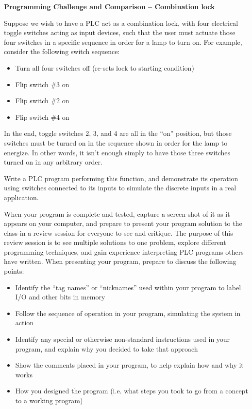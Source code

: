 

\noindent
{\bf Programming Challenge and Comparison -- Combination lock}

\vskip 10pt

Suppose we wish to have a PLC act as a combination lock, with four electrical toggle switches acting as input devices, such that the user must actuate those four switches in a specific sequence in order for a lamp to turn on.  For example, consider the following switch sequence:

\begin{itemize}
\item{} Turn all four switches off (re-sets lock to starting condition)
\item{} Flip switch \#3 on
\item{} Flip switch \#2 on
\item{} Flip switch \#4 on
\end{itemize}

In the end, toggle switches 2, 3, and 4 are all in the ``on'' position, but those switches must be turned on in the sequence shown in order for the lamp to energize.  In other words, it isn't enough simply to have those three switches turned on in any arbitrary order.

Write a PLC program performing this function, and demonstrate its operation using switches connected to its inputs to simulate the discrete inputs in a real application.  

\vskip 10pt

When your program is complete and tested, capture a screen-shot of it as it appears on your computer, and prepare to present your program solution to the class in a review session for everyone to see and critique.  The purpose of this review session is to see multiple solutions to one problem, explore different programming techniques, and gain experience interpreting PLC programs others have written.  When presenting your program, prepare to discuss the following points:

\begin{itemize}
\item{} Identify the ``tag names'' or ``nicknames'' used within your program to label I/O and other bits in memory
\item{} Follow the sequence of operation in your program, simulating the system in action
\item{} Identify any special or otherwise non-standard instructions used in your program, and explain why you decided to take that approach
\item{} Show the comments placed in your program, to help explain how and why it works
\item{} How you designed the program (i.e. what steps you took to go from a concept to a working program)
\end{itemize}

